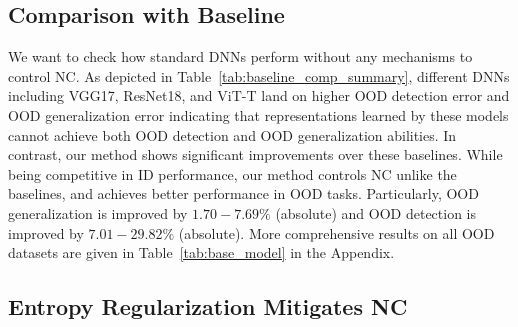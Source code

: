 



\subsection{Comparison with Baseline}




We want to check how standard DNNs perform without any mechanisms to control NC. As depicted in Table~\ref{tab:baseline_comp_summary}, different DNNs including VGG17, ResNet18, and ViT-T land on higher OOD detection error and OOD generalization error indicating that representations learned by these models cannot achieve both OOD detection and OOD generalization abilities. In contrast, our method shows significant improvements over these baselines. While being competitive in ID performance, our method controls NC unlike the baselines, and achieves better performance in OOD tasks. Particularly, OOD generalization is improved by $1.70 - 7.69\%$ (absolute) and OOD detection is improved by $7.01 - 29.82\%$ (absolute).
More comprehensive results on all OOD datasets are given in Table~\ref{tab:base_model} in the Appendix.


%
%
%
%
%
%



\subsection{Entropy Regularization Mitigates NC}



